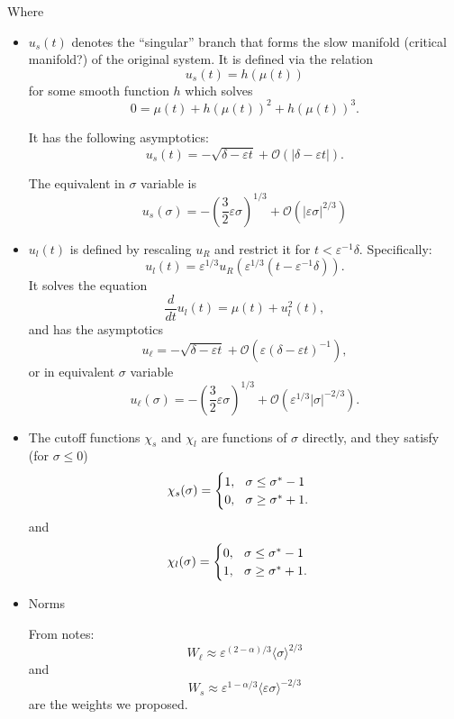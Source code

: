 \documentclass[letterpaper,11pt]{article}
\newcommand{\rmO}{\mathcal{O}}
\newcommand{\eps}{\varepsilon}
\numberwithin{equation}{section}
\theoremstyle{plain}
\begin{document}
Where 
\begin{itemize}
\item $u_s(t)$ denotes the ``singular'' branch that forms the slow manifold (critical manifold?) of the original system. It is defined via the relation
\[
u_s(t) = h(\mu(t))
\]
for some smooth function $h$ which solves
\begin{equation}\label{singular}
0 = \mu(t) + h(\mu(t))^2 + h(\mu(t))^3.
\end{equation}

It has the following asymptotics:
\begin{equation}\label{singularAsy}
u_s(t) = -\sqrt{\delta-\eps t} + \rmO(|\delta-\eps t|).
\end{equation}

The equivalent in $\sigma$ variable is
\begin{equation}\label{singularAsySig}
u_s(\sigma) = -\left(\frac{3}{2}\eps \sigma\right)^{1/3} + \rmO(|\eps \sigma|^{2/3} )
\end{equation}

\item $u_l(t)$ is defined by rescaling $u_R$ and restrict it for $t<\eps^{-1}\delta$. Specifically:
\begin{equation}\label{uldef}
u_l(t) = \eps^{1/3} u_R( \eps^{1/3}(t-\eps^{-1}\delta)).
\end{equation}
It solves the equation
\begin{equation}\label{uleq}
\frac{d}{dt}u_l (t) = \mu(t) + u_l^2(t),
\end{equation}
and has the asymptotics
\[
u_\ell = -\sqrt{\delta-\eps t} + \rmO(\eps(\delta-\eps t)^{-1}),
\]
or in equivalent $\sigma$ variable
\[
u_\ell(\sigma) = -\left(\frac{3}{2}\eps \sigma\right)^{1/3} + \rmO(\eps^{1/3}|\sigma|^{-2/3}).
\]

\item The cutoff functions $\chi_s$ and $\chi_l$ are functions of $\sigma$ directly, and they satisfy (for $\sigma \le 0$)
\begin{equation}\label{cutoffIs}
\chi_s(\sigma) =\begin{cases}
1,  \hspace{0.1in} \sigma \le \sigma^* -1\\
0 , \hspace{0.1in} \sigma \ge \sigma^* +1.
\end{cases}
\end{equation}
and
\begin{equation}\label{cutoffIl}
\chi_l(\sigma) =\begin{cases}
0,  \hspace{0.1in} \sigma \le \sigma^* -1\\
1 , \hspace{0.1in} \sigma \ge \sigma^* +1.
\end{cases}
\end{equation}

\item Norms

From notes:
\[
W_{\ell} \approx \eps^{(2-\alpha)/3}\langle \sigma \rangle^{2/3}
\]
and
\[
W_s \approx \eps^{1-\alpha/3}\langle \eps \sigma\rangle^{-2/3}
\]
are the weights we proposed.
\end{itemize} 
\end{document}
